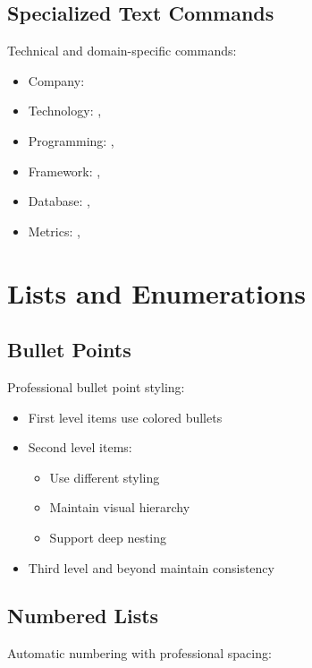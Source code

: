 \documentclass{internshipreport}
\begin{document}
\subsection{Specialized Text Commands}

Technical and domain-specific commands:

\begin{itemize}
\item Company: 
\item Technology: , 
\item Programming: , 
\item Framework: , 
\item Database: , 
\item Metrics: , 
\end{itemize}

\section{Lists and Enumerations}

\subsection{Bullet Points}

Professional bullet point styling:

\begin{itemize}
\item First level items use colored bullets
\item Second level items:
    \begin{itemize}
    \item Use different styling
    \item Maintain visual hierarchy
    \item Support deep nesting
    \end{itemize}
\item Third level and beyond maintain consistency
\end{itemize}

\subsection{Numbered Lists}

Automatic numbering with professional spacing:
\end{document}
